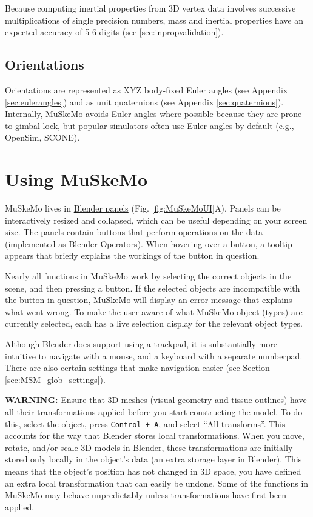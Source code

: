 \documentclass{article}
\begin{document}
Because computing inertial properties from 3D vertex data involves successive multiplications of single precision numbers, mass and inertial properties have an expected accuracy of 5-6 digits (see \ref{sec:inpropvalidation}).

\subsection{Orientations}

Orientations are represented as XYZ body-fixed Euler angles (see Appendix \ref{sec:eulerangles}) and as unit quaternions (see Appendix \ref{sec:quaternions}). Internally, MuSkeMo avoids Euler angles where possible because they are prone to gimbal lock, but popular simulators often use Euler angles by default (e.g., OpenSim, SCONE).


\section{Using MuSkeMo}

MuSkeMo lives in \href{https://docs.blender.org/manual/en/latest/interface/window_system/tabs_panels.html}{Blender panels} (Fig. \ref{fig:MuSkeMoUI}A). Panels can be interactively resized and collapsed, which can be useful depending on your screen size. The panels contain buttons that perform operations on the data (implemented as \href{https://docs.blender.org/api/current/bpy.types.Operator.html}{Blender Operators}). When hovering over a button, a tooltip appears that briefly explains the workings of the button in question. 

Nearly all functions in MuSkeMo work by selecting the correct objects in the scene, and then pressing a button. If the selected objects are incompatible with the button in question, MuSkeMo will display an error message that explains what went wrong. To make the user aware of what MuSkeMo object (types) are currently selected, each has a live selection display for the relevant object types.


Although Blender does support using a trackpad, it is substantially more intuitive to navigate with a mouse, and a keyboard with a separate numberpad. There are also certain settings that make navigation easier (see Section \ref{sec:MSM_glob_settings}).


\textbf{WARNING:} Ensure that 3D meshes (visual geometry and tissue outlines) have all their transformations applied before you start constructing the model. To do this, select the object, press \texttt{Control + A}, and select “All transforms”. This accounts for the way that Blender stores local transformations. When you move, rotate, and/or scale 3D models in Blender, these transformations are initially stored only locally in the object’s data (an extra storage layer in Blender). This means that the object’s position has not changed in 3D space, you have defined an extra local transformation that can easily be undone. Some of the functions in MuSkeMo may behave unpredictably unless transformations have first been applied.
\end{document}
